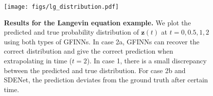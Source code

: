 \documentclass[openacc]{rsproca_new}%
\newcommand{\z}{\bm{z}}
\begin{document}
\begin{figure}[ht]
    \centering
    \texttt{[image: figs/lg\_distribution.pdf]}
    \caption{\textbf{Results for the Langevin equation example.} We plot the predicted and true probability distribution of $\z(t)$ at $t=0,0.5,1,2$ using both types of GFINNs. In case 2a, GFINNs can recover the correct distribution and give the correct prediction when extrapolating in time ($t = 2$). In case 1, there is a small discrepancy between the predicted and true distribution. For case 2b and SDENet, the prediction deviates from the ground truth after certain time.}
    \label{fig:LG_dist}
\end{figure}



\end{document}
